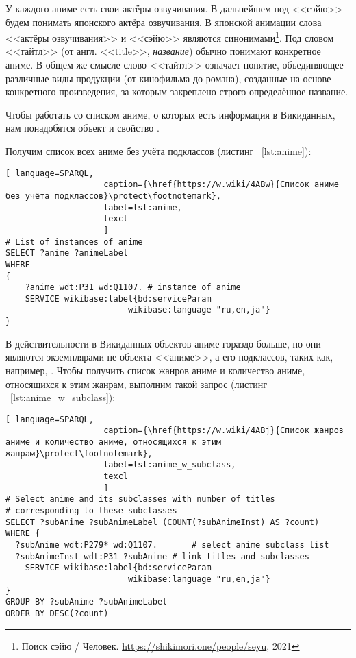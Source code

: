 У каждого аниме есть свои актёры озвучивания. В дальнейшем под <<сэйю>> будем понимать японского актёра озвучивания. В японской анимации слова <<актёры озвучивания>> и <<сэйю>> являются синонимами\footnote{Поиск сэйю / Человек. \href{https://
shikimori.one/people/seyu}{https://shikimori.one/people/seyu}, 2021}. Под словом <<тайтл>> (от англ. <<title>>, \emph{название}) обычно понимают конкретное аниме\cite{anime_social}. В общем же смысле слово <<тайтл>> означает понятие, объединяющее различные виды продукции (от кинофильма до романа), созданные на основе конкретного произведения, за которым закреплено строго определённое название\cite{anime_title_def}.

Чтобы работать со списком аниме, о которых есть информация в Викиданных, нам понадобятся объект  и свойство .

Получим список всех аниме без учёта подклассов (листинг ~\protect\ref{lst:anime}):

\begin{lstlisting}[ language=SPARQL, 
                    caption={\href{https://w.wiki/4ABw}{Список аниме без учёта подклассов}\protect\footnotemark},
                    label=lst:anime,
                    texcl 
                    ]
# List of instances of anime
SELECT ?anime ?animeLabel
WHERE
{
    ?anime wdt:P31 wd:Q1107. # instance of anime
    SERVICE wikibase:label{bd:serviceParam
					     wikibase:language "ru,en,ja"}
}
\end{lstlisting}%

В действительности в Викиданных объектов аниме гораздо больше, но они являются экземплярами не объекта <<аниме>>, а его подклассов, таких как, например, . Чтобы получить список жанров аниме и количество аниме, относящихся к этим жанрам, выполним такой запрос (листинг ~\protect\ref{lst:anime_w_subclass}):

\begin{lstlisting}[ language=SPARQL, 
                    caption={\href{https://w.wiki/4ABj}{Список жанров аниме и количество аниме, относящихся к этим жанрам}\protect\footnotemark},
                    label=lst:anime_w_subclass,
                    texcl 
                    ]
# Select anime and its subclasses with number of titles
# corresponding to these subclasses
SELECT ?subAnime ?subAnimeLabel (COUNT(?subAnimeInst) AS ?count)
WHERE {
  ?subAnime wdt:P279* wd:Q1107.       # select anime subclass list
  ?subAnimeInst wdt:P31 ?subAnime # link titles and subclasses
    SERVICE wikibase:label{bd:serviceParam
					     wikibase:language "ru,en,ja"}
}
GROUP BY ?subAnime ?subAnimeLabel
ORDER BY DESC(?count)
\end{lstlisting}%

